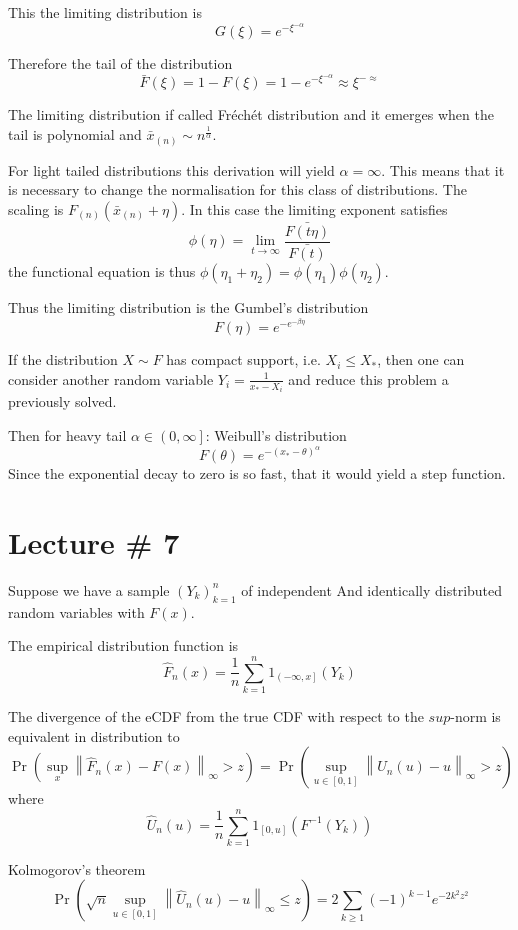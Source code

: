 \documentclass[a4paper]{article}
\newcommand{\clo}[1]{{\left [ #1 \right ]}}
\newcommand{\ploc}[1]{{\left ( #1 \right ]}}
\newcommand{\brac}[1]{{\left ( #1 \right )}}
\newcommand{\nrm}[1]{{\left\| #1 \right \|}}
\begin{document}
This the limiting distribution is
\[G(\xi) = e^{-\xi^{-\alpha}}\]

Therefore the tail of the distribution
\[\bar{F}(\xi) = 1 - F(\xi) = 1-e^{-\xi^{-\alpha}}\approx \xi^{-\approx}\]

The limiting distribution if called Fr\'ech\'et distribution and it emerges when the tail is polynomial and $\bar{x}_{(n)}\sim n^\frac{1}{\alpha}$.

For light tailed distributions this derivation will yield $\alpha=\infty$. This means that it is necessary to change the normalisation for this class of distributions. The scaling is $F_{(n)}(\bar{x}_{(n)} + \eta)$. In this case the limiting exponent satisfies
\[\phi(\eta) =\lim_{t\to\infty} \frac{\bar{F(t\eta)}}{\bar{F(t)}}\]
the functional equation is thus $\phi(\eta_1+\eta_2)=\phi(\eta_1)\phi(\eta_2)$.

Thus the limiting distribution is the Gumbel's distribution
\[F(\eta) = e^{-e^{-\beta\eta}}\]

If the distribution $X\sim F$ has compact support, i.e. $X_i\leq X_*$, then one can consider another random variable $Y_i = \frac{1}{x_*-X_i}$ and reduce this problem a previously solved.

Then for heavy tail $\alpha\in\ploc{0,\infty}$: Weibull's distribution
\[F(\theta) = e^{-{(x_*-\theta)}^\alpha}\]
Since the exponential decay to zero is so fast, that it would yield a step function.



\section{Lecture \# 7} %
\label{sec:lecture_7}

Suppose we have a sample  $\brac{Y_k}_{k=1}^n$ of independent And identically distributed random variables with $F(x)$.

The empirical distribution function is
\[\hat{F}_n(x) = \frac{1}{n}\sum_{k=1}^n 1_{\ploc{-\infty, x}}(Y_k)\]

The divergence of the eCDF from the true CDF with respect to the $
sup$-norm is equivalent in distribution to
\[\Pr\brac{\sup_{x}\nrm{\hat{F}_n(x) - F(x)}_\infty > z} = \Pr\brac{\sup_{u\in\clo{0,1}}\nrm{\hat{U}_n(u) - u}_\infty > z}\]
where 
\[\hat{U}_n(u) = \frac{1}{n}\sum_{k=1}^n 1_{\clo{0, u}}\brac{F^{-1}(Y_k)}\]

Kolmogorov's theorem
\[\Pr\brac{\sqrt{n} \sup_{u\in\clo{0,1}}\nrm{\hat{U}_n(u) - u}_\infty \leq z} = 2\sum_{k\geq1} {(-1)}^{k-1} e^{-2 k^2 z^2}\]
\end{document}
